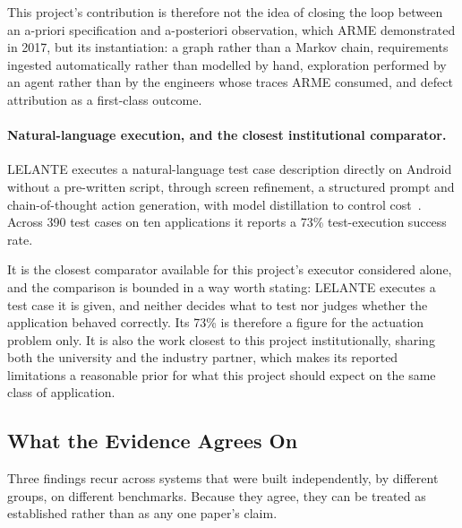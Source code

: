 This project's contribution is therefore not the idea of closing the loop
between an a-priori specification and a-posteriori observation, which ARME
demonstrated in 2017, but its instantiation: a graph rather than a Markov
chain, requirements ingested automatically rather than modelled by hand,
exploration performed by an agent rather than by the engineers whose traces
ARME consumed, and defect attribution as a first-class outcome.

\paragraph{Natural-language execution, and the closest institutional
comparator.} LELANTE executes a natural-language test case description directly
on Android without a pre-written script, through screen refinement, a
structured prompt and chain-of-thought action generation, with model
distillation to control cost~\cite{lelante}. Across 390 test cases on ten
applications it reports a 73\% test-execution success rate.

It is the closest comparator available for this project's executor considered
alone, and the comparison is bounded in a way worth stating: LELANTE executes a
test case it is given, and neither decides what to test nor judges whether the
application behaved correctly. Its 73\% is therefore a figure for the
actuation problem only. It is also the work closest to this project
institutionally, sharing both the university and the industry partner, which
makes its reported limitations a reasonable prior for what this project should
expect on the same class of application.

\subsection{What the Evidence Agrees On}
\label{subsec:agreement}

Three findings recur across systems that were built independently, by different
groups, on different benchmarks. Because they agree, they can be treated as
established rather than as any one paper's claim.

